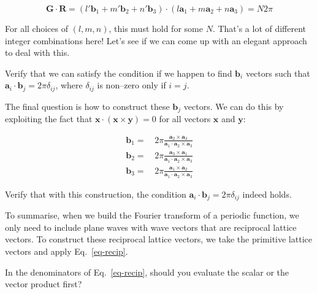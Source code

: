 \begin{equation}
{\mathbf G} \cdot {\mathbf R} = ( l' {\mathbf b}_1 + m' {\mathbf b}_2 + n' {\mathbf b}_3) \cdot (l {\mathbf a}_1 + m {\mathbf a}_2 + n {\mathbf a}_3)  = N 2 \pi 
\end{equation} 

For all choices of $(l,m,n)$, this must hold for some $N$. That's a lot of different integer combinations here! Let's see if we can come up with an elegant approach to deal with this.


\begin{cue}
Verify that we can satisfy the condition if we happen to find ${\mathbf b}_i$ vectors such that ${\mathbf a}_i \cdot {\mathbf b}_j = 2 \pi \delta_{ij}$, where $\delta_{ij}$ is non--zero only if $i=j$.
\end{cue}

The final question is how to construct these ${\mathbf b}_j$ vectors. We can do this by exploiting the fact that $ {\mathbf x} \cdot ({\mathbf x} \times {\mathbf y}) = 0$ for all vectors ${\mathbf x}$ and ${\mathbf y}$:

\begin{align}
{\mathbf b}_1 =&  \, 2 \pi \frac{{\mathbf a}_2 \times {\mathbf a}_3}{{\mathbf a}_1 \cdot {\mathbf a}_2 \times {\mathbf a}_3} \nonumber \\
  {\mathbf b}_2 =& \, 2 \pi \frac{{\mathbf a}_3 \times {\mathbf a}_1}{{\mathbf a}_1 \cdot {\mathbf a}_2 \times {\mathbf a}_3} \nonumber \\
  {\mathbf b}_3 =& \, 2 \pi \frac{{\mathbf a}_1 \times {\mathbf a}_2}{{\mathbf a}_1 \cdot {\mathbf a}_2 \times {\mathbf a}_3}
\label{eq-recip}
\end{align} 

\begin{cue}
Verify that with this construction, the condition  ${\mathbf a}_i \cdot {\mathbf b}_j = 2 \pi \delta_{ij}$ indeed holds. 
\end{cue}

To summarise, when we build the Fourier transform of a periodic function, we only need to include plane waves with wave vectors that are reciprocal lattice vectors. To construct these reciprocal lattice vectors, we take the primitive lattice vectors and apply Eq.~\ref{eq-recip}.

\begin{exer}
In the denominators of Eq.~\ref{eq-recip}, should you evaluate the scalar or the vector product first?
\end{exer}

